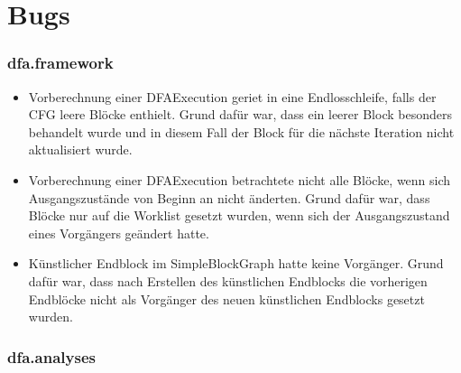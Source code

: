 \part{Bugs}

\section{dfa.framework}

\begin{itemize}
	\item Vorberechnung einer DFAExecution geriet in eine Endlosschleife, falls der CFG leere Blöcke enthielt.
	Grund dafür war, dass ein leerer Block besonders behandelt wurde und in diesem Fall der Block für die nächste Iteration nicht aktualisiert wurde.
	\item Vorberechnung einer DFAExecution betrachtete nicht alle Blöcke, wenn sich Ausgangszustände von Beginn an nicht änderten. Grund dafür war, dass Blöcke nur auf die Worklist gesetzt wurden, wenn sich der Ausgangszustand eines Vorgängers geändert hatte. 
	\item Künstlicher Endblock im SimpleBlockGraph hatte keine Vorgänger. Grund dafür war, dass nach Erstellen des künstlichen Endblocks die vorherigen Endblöcke nicht als Vorgänger des neuen künstlichen Endblocks gesetzt wurden.
\end{itemize}

\section{dfa.analyses}

